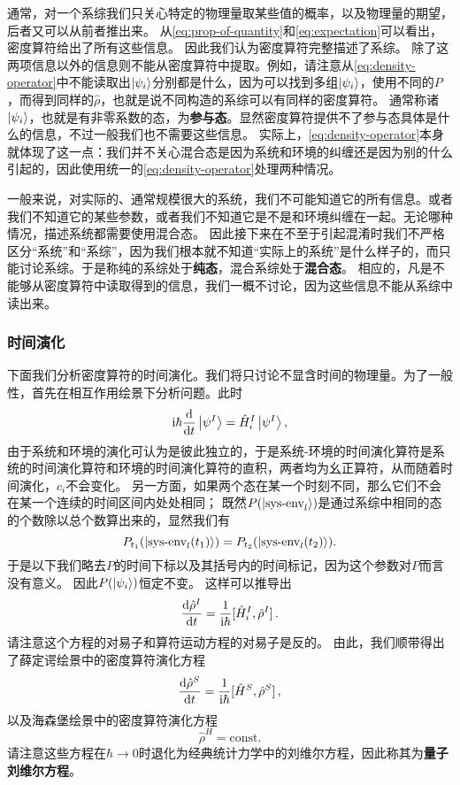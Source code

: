 \documentclass[hyperref, UTF8, a4paper]{ctexart}
\newcommand*{\ii}{\mathrm{i}}
\newcommand*{\const}{\mathrm{const}}
\begin{document}
通常，对一个系综我们只关心特定的物理量取某些值的概率，以及物理量的期望，后者又可以从前者推出来。
从\eqref{eq:prop-of-quantity}和\eqref{eq:expectation}可以看出，密度算符给出了所有这些信息。
因此我们认为密度算符完整描述了系综。
除了这两项信息以外的信息则不能从密度算符中提取。例如，请注意从\eqref{eq:density-operator}中不能读取出$\ket{\psi_i}$分别都是什么，因为可以找到多组$\ket{\psi_i}$，使用不同的$P$，而得到同样的$\hat{\rho}$，也就是说不同构造的系综可以有同样的密度算符。
通常称诸$\ket{\psi_i}$，也就是有非零系数的态，为\textbf{参与态}。显然密度算符提供不了参与态具体是什么的信息，不过一般我们也不需要这些信息。
实际上，\eqref{eq:density-operator}本身就体现了这一点：我们并不关心混合态是因为系统和环境的纠缠还是因为别的什么引起的，因此使用统一的\eqref{eq:density-operator}处理两种情况。

一般来说，对实际的、通常规模很大的系统，我们不可能知道它的所有信息。或者我们不知道它的某些参数，或者我们不知道它是不是和环境纠缠在一起。无论哪种情况，描述系统都需要使用混合态。
因此接下来在不至于引起混淆时我们不严格区分“系统”和“系综”，因为我们根本就不知道“实际上的系统”是什么样子的，而只能讨论系综。于是称纯的系综处于\textbf{纯态}，混合系综处于\textbf{混合态}。
相应的，凡是不能够从密度算符中读取得到的信息，我们一概不讨论，因为这些信息不能从系综中读出来。

\subsubsection{时间演化}

下面我们分析密度算符的时间演化。我们将只讨论不显含时间的物理量。为了一般性，首先在相互作用绘景下分析问题。此时
\[
    \ii \hbar \dv{t} \ket{\psi^I} = \hat{H}_i^I \ket{\psi^I},
\]
由于系统和环境的演化可认为是彼此独立的，于是系统-环境的时间演化算符是系统的时间演化算符和环境的时间演化算符的直积，两者均为幺正算符，从而随着时间演化，$c_i$不会变化。
另一方面，如果两个态在某一个时刻不同，那么它们不会在某一个连续的时间区间内处处相同；
既然$P(\ket{\text{sys-env}_l})$是通过系综中相同的态的个数除以总个数算出来的，显然我们有
\[
    P_{t_1} (\ket{\text{sys-env}_l (t_1)}) = P_{t_2} (\ket{\text{sys-env}_l (t_2)}).
\]
于是以下我们略去$P$的时间下标以及其括号内的时间标记，因为这个参数对$P$而言没有意义。
因此$P(\ket{\psi_i})$恒定不变。
这样可以推导出
\begin{equation}
    \dv{\hat{\rho}^I}{t} = \frac{1}{\ii \hbar} \comm*{\hat{H}_i^I}{\hat{\rho}^I}.
\end{equation}
请注意这个方程的对易子和算符运动方程的对易子是反的。
由此，我们顺带得出了薛定谔绘景中的密度算符演化方程
\begin{equation}
    \dv{\hat{\rho}^S}{t} = \frac{1}{\ii \hbar} \comm*{\hat{H}^S}{\hat{\rho}^S},
\end{equation}
以及海森堡绘景中的密度算符演化方程
\begin{equation}
    \hat{\rho}^H = \const.
\end{equation}
请注意这些方程在$\hbar \to 0$时退化为经典统计力学中的刘维尔方程，因此称其为\textbf{量子刘维尔方程}。
\end{document}

